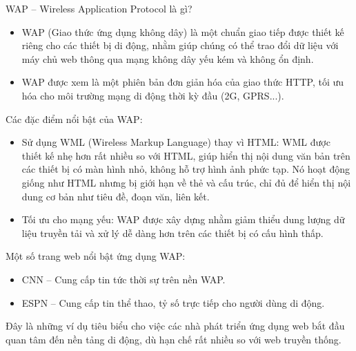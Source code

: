     \begin{flushleft}
      \hspace*{0.8cm}WAP – Wireless Application Protocol là gì?
      \setlength{\leftmargini}{1.5cm}
      \begin{itemize}
          \item WAP (Giao thức ứng dụng không dây) là một chuẩn giao tiếp được thiết kế riêng cho các thiết bị di động, nhằm giúp chúng có thể trao đổi dữ liệu với máy chủ web thông qua mạng không dây yếu kém và không ổn định.
          \item WAP được xem là một phiên bản đơn giản hóa của giao thức HTTP, tối ưu hóa cho môi trường mạng di động thời kỳ đầu (2G, GPRS...).
      \end{itemize}
  \end{flushleft}

  \begin{flushleft}
    \hspace*{0.8cm}Các đặc điểm nổi bật của WAP:
    \setlength{\leftmargini}{1.5cm}
    \begin{itemize}
        \item Sử dụng WML (Wireless Markup Language) thay vì HTML: WML được thiết kế nhẹ hơn rất nhiều so với HTML, giúp hiển thị nội dung văn bản trên các thiết bị có màn hình nhỏ, không hỗ trợ hình ảnh phức tạp. Nó hoạt động giống như HTML nhưng bị giới hạn về thẻ và cấu trúc, chỉ đủ để hiển thị nội dung cơ bản như tiêu đề, đoạn văn, liên kết.
        \item Tối ưu cho mạng yếu: WAP được xây dựng nhằm giảm thiểu dung lượng dữ liệu truyền tải và xử lý dễ dàng hơn trên các thiết bị có cấu hình thấp.
    \end{itemize}
  \end{flushleft}

  \begin{flushleft}
    \hspace*{0.8cm}Một số trang web nổi bật ứng dụng WAP:
    \setlength{\leftmargini}{1.5cm}
    \begin{itemize}
        \item CNN – Cung cấp tin tức thời sự trên nền WAP.
        \item ESPN – Cung cấp tin thể thao, tỷ số trực tiếp cho người dùng di động.
    \end{itemize}
  \end{flushleft}

  \begin{flushleft}
    \hspace*{0.8cm}Đây là những ví dụ tiêu biểu cho việc các nhà phát triển ứng dụng web bắt đầu quan tâm đến nền tảng di động, dù hạn chế rất nhiều so với web truyền thống.
  \end{flushleft}

